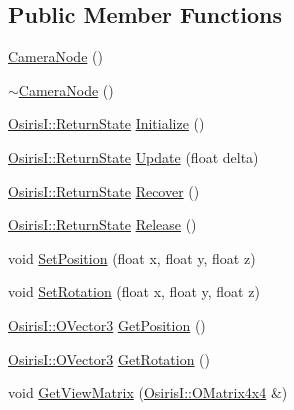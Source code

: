 \subsection*{Public Member Functions}
\begin{DoxyCompactItemize}
\item 
\hyperlink{class_osiris_i_1_1_graphics_1_1_scenes_1_1_camera_node_a57a8a55d15996a3eb755289b7c8fea8c}{Camera\-Node} ()
\item 
\hyperlink{class_osiris_i_1_1_graphics_1_1_scenes_1_1_camera_node_a5522ffc2a3af2a31e8e7d9f51511c699}{$\sim$\-Camera\-Node} ()
\item 
\hyperlink{namespace_osiris_i_a8f53bf938dc75c65c6a529694514013e}{Osiris\-I\-::\-Return\-State} \hyperlink{class_osiris_i_1_1_graphics_1_1_scenes_1_1_camera_node_ae4ce15659c788b26c50240f9dc2ee710}{Initialize} ()
\item 
\hyperlink{namespace_osiris_i_a8f53bf938dc75c65c6a529694514013e}{Osiris\-I\-::\-Return\-State} \hyperlink{class_osiris_i_1_1_graphics_1_1_scenes_1_1_camera_node_a454d383d48854e08fb820676ec36ea50}{Update} (float delta)
\item 
\hyperlink{namespace_osiris_i_a8f53bf938dc75c65c6a529694514013e}{Osiris\-I\-::\-Return\-State} \hyperlink{class_osiris_i_1_1_graphics_1_1_scenes_1_1_camera_node_a65978f76971c94eb641f16d652e33e3e}{Recover} ()
\item 
\hyperlink{namespace_osiris_i_a8f53bf938dc75c65c6a529694514013e}{Osiris\-I\-::\-Return\-State} \hyperlink{class_osiris_i_1_1_graphics_1_1_scenes_1_1_camera_node_a8c7532104fc8f4f670463a8cfda13fe1}{Release} ()
\item 
void \hyperlink{class_osiris_i_1_1_graphics_1_1_scenes_1_1_camera_node_ac3f779be7e20336f8398312021ae4b80}{Set\-Position} (float x, float y, float z)
\item 
void \hyperlink{class_osiris_i_1_1_graphics_1_1_scenes_1_1_camera_node_a10211b6a0ac54e2deb0aa322e1e8bf5f}{Set\-Rotation} (float x, float y, float z)
\item 
\hyperlink{struct_osiris_i_1_1_o_vector3}{Osiris\-I\-::\-O\-Vector3} \hyperlink{class_osiris_i_1_1_graphics_1_1_scenes_1_1_camera_node_ad2c05256c58eeb7ac5c02c161600cc2c}{Get\-Position} ()
\item 
\hyperlink{struct_osiris_i_1_1_o_vector3}{Osiris\-I\-::\-O\-Vector3} \hyperlink{class_osiris_i_1_1_graphics_1_1_scenes_1_1_camera_node_a3015ce07f4af514d8f2f5ed5659ce15f}{Get\-Rotation} ()
\item 
void \hyperlink{class_osiris_i_1_1_graphics_1_1_scenes_1_1_camera_node_aaff17ed9e6076abfc971d35954fc336d}{Get\-View\-Matrix} (\hyperlink{struct_osiris_i_1_1_o_matrix4x4}{Osiris\-I\-::\-O\-Matrix4x4} \&)

\end{DoxyCompactItemize}
